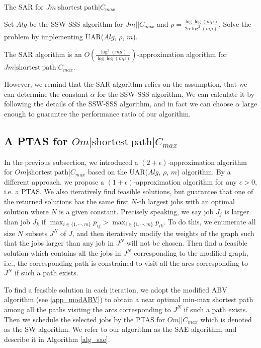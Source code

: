 \documentclass{llncs}
\numberwithin{subcase}{case}
\begin{document}
\begin{algorithm}[htb]
\caption{The SAR for $Jm|\mathrm{shortest}~\mathrm{path}|C_{max}$}
\label{alg_sar}
\begin{algorithmic}[1]
\STATE Set $Alg$ be the SSW-SSS algorithm for $Jm||C_{max}$ and $\rho = \frac{\log{\log(m\mu)}}{2\alpha\log^2(m\mu)}$.
\STATE Solve the problem by implementing UAR($Alg$, $\rho$, $m$).
\end{algorithmic}
\end{algorithm}

\begin{theorem}
The SAR algorithm is an $O\left(\frac{\log^2(m\mu)}{\log{\log(m\mu)}}\right)$-approximation algorithm for $Jm|\mathrm{shortest}~\mathrm{path}|C_{max}$.  \label{th_SAR}
\end{theorem}

However, we remind that the SAR algorithm relies on the assumption, that we can determine the constant $\alpha$ for the SSW-SSS algorithm. We can calculate it by following the details of the SSW-SSS algorithm, and in fact we can choose $\alpha$ large enough to guarantee the performance ratio of our algorithm.

\subsection{A PTAS for $Om|\mathrm{shortest}~\mathrm{path}|C_{max}$}\label{sec_alg_1+e_o}
In the previous subsection, we introduced a $(2+\epsilon)$-approximation algorithm for $Om|\mathrm{shortest}~\mathrm{path}|C_{max}$ based on the UAR($Alg$, $\rho$, $m$) algorithm. By a different approach, we propose a $(1+\epsilon)$-approximation algorithm for any $\epsilon>0$, i.e. a PTAS. We also iteratively find feasible solutions, but guarantee that one of the returned solutions has the same first $N$-th largest jobs with an optimal solution where $N$ is a given constant. Precisely speaking, we say job $J_j$ is larger than job $J_k$ if $\max_{i\in \{1, \cdots, m\}}p_{ij}>\max_{i\in \{1, \cdots, m\}}p_{ik}$. To do this, we enumerate all size $N$ subsets $J^N$ of $J$, and then iteratively modify the weights of the graph such that the jobs larger than any job in $J^N$ will not be chosen. Then find a feasible solution which contains all the jobs in $J^N$ corresponding to the modified graph, i.e., the corresponding path is constrained to visit all the arcs corresponding to $J^N$ if such a path exists.

To find a feasible solution in each iteration, we adopt the modified ABV algorithm (see \ref{app_modABV}) to obtain a near optimal min-max shortest path among all the paths visiting the arcs corresponding to $J^N$ if such a path exists. Then we schedule the selected jobs by the PTAS for $Om||C_{max}$ \cite{Sevastianov1998} which is denoted as the SW algorithm. We refer to our algorithm as the SAE algorithm, and describe it in Algorithm \ref{alg_sae}.
\end{document}
